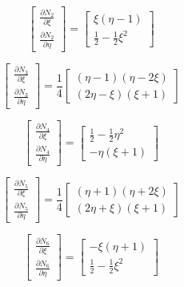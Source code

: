 \documentclass[a4paper, 12pt]{article}
\begin{document}
\begin{enumerate}
\begin{enumerate}
			\[
				\begin{bmatrix}
				\frac{\partial N_2}{\partial \xi} \\ 
				\frac{\partial N_2}{\partial \eta}
				\end{bmatrix}
				=
				\begin{bmatrix}
				\xi(\eta - 1) \\ 
				\frac{1}{2} - \frac{1}{2}\xi^2
				\end{bmatrix}
			\]

			\[
				\begin{bmatrix}
				\frac{\partial N_3}{\partial \xi} \\ 
				\frac{\partial N_3}{\partial \eta}
				\end{bmatrix}
				=
				\frac{1}{4}
				\begin{bmatrix}
				(\eta - 1)(\eta - 2\xi) \\ 
				(2\eta - \xi)(\xi + 1)
				\end{bmatrix}
			\]

			\[
				\begin{bmatrix}
				\frac{\partial N_4}{\partial \xi} \\ 
				\frac{\partial N_4}{\partial \eta}
				\end{bmatrix}
				=
				\begin{bmatrix}
				\frac{1}{2} - \frac{1}{2}\eta^2 \\ 
				-\eta(\xi + 1)
				\end{bmatrix}
			\]

			\[
				\begin{bmatrix}
				\frac{\partial N_5}{\partial \xi} \\ 
				\frac{\partial N_5}{\partial \eta}
				\end{bmatrix}
				=
				\frac{1}{4}
				\begin{bmatrix}
				(\eta + 1)(\eta + 2\xi) \\ 
				(2\eta + \xi)(\xi + 1)
				\end{bmatrix}
			\]

			\[
				\begin{bmatrix}
				\frac{\partial N_6}{\partial \xi} \\ 
				\frac{\partial N_6}{\partial \eta}
				\end{bmatrix}
				=
				\begin{bmatrix}
				-\xi(\eta + 1) \\ 
				\frac{1}{2} - \frac{1}{2}\xi^2
				\end{bmatrix}
			\]


\end{enumerate}
\end{enumerate}
\end{document}
